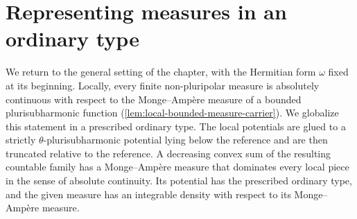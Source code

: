 \section{Representing measures in an ordinary type}
\label{sec:relative-measure-carrier}\label{sec:bounded-measure-carrier}

We return to the general setting of the chapter, with the Hermitian form $\omega$ fixed at its beginning. Locally, every finite non-pluripolar measure is absolutely continuous with respect to the Monge--Amp\`ere measure of a bounded plurisubharmonic function (\cref{lem:local-bounded-measure-carrier}). We globalize this statement in a prescribed ordinary type. The local potentials are glued to a strictly $\theta$-plurisubharmonic potential lying below the reference and are then truncated relative to the reference. A decreasing convex sum of the resulting countable family has a Monge--Amp\`ere measure that dominates every local piece in the sense of absolute continuity. Its potential has the prescribed ordinary type, and the given measure has an integrable density with respect to its Monge--Amp\`ere measure.

